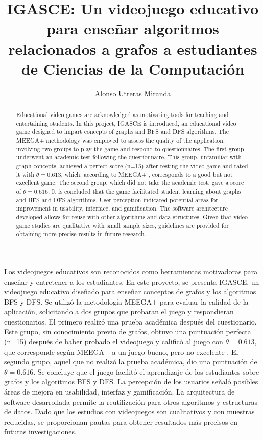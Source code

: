 \documentclass{umemoria}
\author{Alonso Utreras Miranda}
\title{IGASCE: Un videojuego educativo para enseñar algoritmos relacionados a grafos a estudiantes de Ciencias de la Computación}
\begin{document}
\frontmatter
\maketitle

\begin{resumen}

Los videojuegos educativos son reconocidos como herramientas motivadoras para enseñar y entretener a los estudiantes. En este proyecto, se presenta IGASCE, un videojuego educativo diseñado para enseñar conceptos de grafos y los algoritmos BFS y DFS. Se utilizó la metodología MEEGA+ \cite{meegaplus} para evaluar la calidad de la aplicación, solicitando a dos grupos que probaran el juego y respondieran cuestionarios. El primero realizó una prueba académica después del cuestionario. Este grupo, sin conocimiento previo de grafos, obtuvo una puntuación perfecta (n=15) después de haber probado el videojuego y calificó al juego con $\theta = 0.613$, que corresponde según MEEGA+ a un juego bueno, pero no excelente \cite{MeegaPlusManual}. El segundo grupo, aquel que no realizó la prueba académica, dio una puntuación de $\theta = 0.616$. Se concluye que el juego facilitó el aprendizaje de los estudiantes sobre grafos y los algoritmos BFS y DFS. La percepción de los usuarios señaló posibles áreas de mejora en usabilidad, interfaz y gamificación. La arquitectura de software desarrollada permite la reutilización para otros algoritmos y estructuras de datos. Dado que los estudios con videojuegos son cualitativos y con muestras reducidas, se proporcionan pautas para obtener resultados más precisos en futuras investigaciones.


\end{resumen}


\begin{abstract}

Educational video games are acknowledged as motivating tools for teaching and entertaining students. In this project, IGASCE is introduced, an educational video game designed to impart concepts of graphs and BFS and DFS algorithms. The MEEGA+ methodology \cite{meegaplus} was employed to assess the quality of the application, involving two groups to play the game and respond to questionnaires. The first group underwent an academic test following the questionnaire. This group, unfamiliar with graph concepts, achieved a perfect score (n=15) after testing the video game and rated it with $\theta = 0.613$, which, according to MEEGA+ \cite{MeegaPlusManual}, corresponds to a good but not excellent game. The second group, which did not take the academic test, gave a score of $\theta = 0.616$. It is concluded that the game facilitated student learning about graphs and BFS and DFS algorithms. User perception indicated potential areas for improvement in usability, interface, and gamification. The software architecture developed allows for reuse with other algorithms and data structures. Given that video game studies are qualitative with small sample sizes, guidelines are provided for obtaining more precise results in future research.

\end{abstract}
\end{document}
